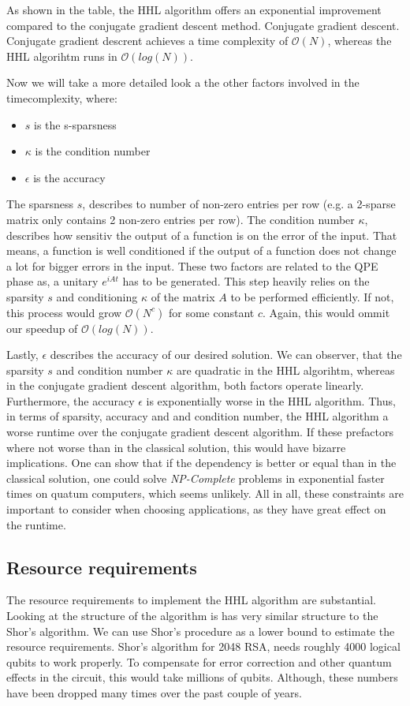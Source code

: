 As shown in the table, the HHL algorithm offers an exponential improvement compared to the conjugate gradient descent method.
Conjugate gradient descent.
Conjugate gradient descrent achieves a time complexity of $\mathcal{O}(N)$, whereas the HHL algorihtm runs in $\mathcal{O}(log(N))$.

Now we will take a more detailed look a the other factors involved in the timecomplexity, where:
\begin{itemize}
    \item $s$ is the s-sparsness
    \item $\kappa$ is the condition number
    \item $\epsilon$ is the accuracy
\end{itemize}

The sparsness $s$, describes to number of non-zero entries per row
(e.g. a 2-sparse matrix only contains 2 non-zero entries per row).
The condition number $\kappa$, describes how sensitiv the output of a function is on the error of the input.
That means, a function is well conditioned if the output of a function does not change a lot for bigger errors in the input. 
These two factors are related to the QPE phase as, a unitary $e^{iAt}$ has to be generated. 
This step heavily relies on the sparsity $s$ and conditioning $\kappa$ of the matrix $A$ to be performed efficiently.
If not, this process would grow $\mathcal{O}(N^c)$ for some constant $c$.
Again, this would ommit our speedup of $\mathcal{O}(log(N))$.

Lastly, $\epsilon$ describes the accuracy of our desired solution.
We can observer, that the sparsity $s$ and condition number $\kappa$ are quadratic in the HHL algorihtm, whereas in the conjugate gradient descent algorithm, both factors operate linearly.
Furthermore, the accuracy $\epsilon$ is exponentially worse in the HHL algorithm. 
Thus, in terms of sparsity, accuracy and and condition number, the HHL algorithm a worse runtime over the conjugate gradient descent algorithm.
If these prefactors where not worse than in the classical solution, this would have bizarre implications. 
One can show that if the dependency is better or equal than in the classical solution, one could solve \textit{NP-Complete} problems in exponential faster times on quatum computers, which seems unlikely.
All in all, these constraints are important to consider when choosing applications, as they have great effect on the runtime. 


\subsection{Resource requirements}
The resource requirements to implement the HHL algorithm are substantial.
Looking at the structure of the algorithm is has very similar structure to the Shor's algorithm. 
We can use Shor's procedure as a lower bound to estimate the resource requirements.
Shor's algorithm for 2048 RSA, needs roughly 4000 logical qubits to work properly. 
To compensate for error correction and other quantum effects in the circuit, this would take millions of qubits. 
Although, these numbers have been dropped many times over the past couple of years.
